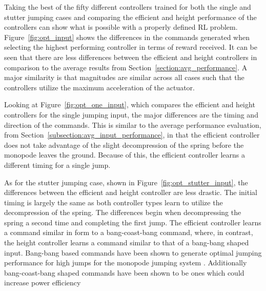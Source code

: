 Taking the best of the fifty different controllers trained for both the single and stutter jumping cases and comparing the efficient and height performance of the controllers can show what is possible with a properly defined RL problem. Figure~\ref{fig:opt_input} shows the differences in the commands generated when selecting the highest performing controller in terms of reward received. It can be seen that there are less differences between the efficient and height controllers in comparison to the average results from Section~\ref{section:avg_performance}. A major similarity is that magnitudes are similar across all cases such that the controllers utilize the maximum acceleration of the actuator. 

Looking at Figure~\ref{fig:opt_one_input}, which compares the efficient and height controllers for the single jumping input, the major differences are the timing and direction of the commands. This is similar to the average performance evaluation, from Section~\ref{subsection:avg_input_performance}, in that the efficient controller does not take advantage of the slight decompression of the spring before the monopode leaves the ground. Because of this, the efficient controller learns a different timing for a single jump. 

As for the stutter jumping case, shown in Figure~\ref{fig:opt_stutter_input}, the differences between the efficient and height controller are less drastic. The initial timing is largely the same as both controller types learn to utilize the decompression of the spring. The differences begin when decompressing the spring a second time and completing the first jump. The efficient controller learns a command similar in form to a bang-coast-bang command, where, in contrast, the height controller learns a command similar to that of a bang-bang shaped input. Bang-bang based commands have been shown to generate optimal jumping performance for high jumps for the monopode jumping system \cite{Vaughan2013}. Additionally bang-coast-bang shaped commands have been shown to be ones which could increase power efficiency \cite{doi:10.2514/2.4036}
% 
